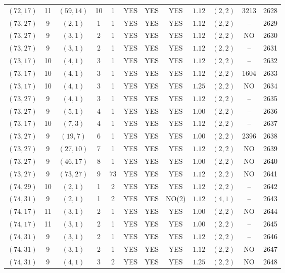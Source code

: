 \begin{longtable}{|c|c|c|c|c|c|c|c|c|c|c|c|}
$(72,17)$ & 11 & $(59,14)$ & 10 & 1 & YES & YES & YES & $1.12$ & $(2,2)$ & 3213 & 2628\\
$(73,27)$ & 9 & $(2,1)$ & 1 & 1 & YES & YES & YES & $1.12$ & $(2,2)$ & -- & 2629\\
$(73,27)$ & 9 & $(3,1)$ & 2 & 1 & YES & YES & YES & $1.12$ & $(2,2)$ & NO & 2630\\
$(73,27)$ & 9 & $(3,1)$ & 2 & 1 & YES & YES & YES & $1.12$ & $(2,2)$ & -- & 2631\\
$(73,17)$ & 10 & $(4,1)$ & 3 & 1 & YES & YES & YES & $1.12$ & $(2,2)$ & -- & 2632\\
$(73,17)$ & 10 & $(4,1)$ & 3 & 1 & YES & YES & YES & $1.12$ & $(2,2)$ & 1604 & 2633\\
$(73,17)$ & 10 & $(4,1)$ & 3 & 1 & YES & YES & YES & $1.25$ & $(2,2)$ & NO & 2634\\
$(73,27)$ & 9 & $(4,1)$ & 3 & 1 & YES & YES & YES & $1.12$ & $(2,2)$ & -- & 2635\\
$(73,27)$ & 9 & $(5,1)$ & 4 & 1 & YES & YES & YES & $1.00$ & $(2,2)$ & -- & 2636\\
$(73,17)$ & 10 & $(7,3)$ & 4 & 1 & YES & YES & YES & $1.12$ & $(2,2)$ & -- & 2637\\
$(73,27)$ & 9 & $(19,7)$ & 6 & 1 & YES & YES & YES & $1.00$ & $(2,2)$ & 2396 & 2638\\
$(73,27)$ & 9 & $(27,10)$ & 7 & 1 & YES & YES & YES & $1.12$ & $(2,2)$ & NO & 2639\\
$(73,27)$ & 9 & $(46,17)$ & 8 & 1 & YES & YES & YES & $1.00$ & $(2,2)$ & NO & 2640\\
$(73,27)$ & 9 & $(73,27)$ & 9 & 73 & YES & YES & YES & $1.12$ & $(2,2)$ & NO & 2641\\
$(74,29)$ & 10 & $(2,1)$ & 1 & 2 & YES & YES & YES & $1.12$ & $(2,2)$ & -- & 2642\\
$(74,31)$ & 9 & $(2,1)$ & 1 & 2 & YES & YES & NO(2) & $1.12$ & $(4,1)$ & -- & 2643\\
$(74,17)$ & 11 & $(3,1)$ & 2 & 1 & YES & YES & YES & $1.00$ & $(2,2)$ & NO & 2644\\
$(74,17)$ & 11 & $(3,1)$ & 2 & 1 & YES & YES & YES & $1.00$ & $(2,2)$ & -- & 2645\\
$(74,31)$ & 9 & $(3,1)$ & 2 & 1 & YES & YES & YES & $1.12$ & $(2,2)$ & -- & 2646\\
$(74,31)$ & 9 & $(3,1)$ & 2 & 1 & YES & YES & YES & $1.12$ & $(2,2)$ & NO & 2647\\
$(74,31)$ & 9 & $(4,1)$ & 3 & 2 & YES & YES & YES & $1.25$ & $(2,2)$ & NO & 2648\\

\end{longtable}
